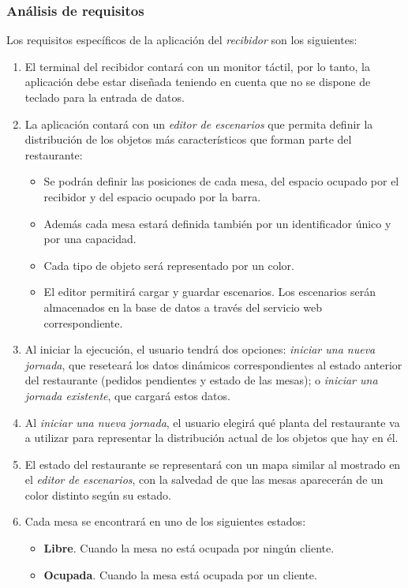 \subsubsection{Análisis de requisitos}
Los requisitos específicos de la aplicación del \emph{recibidor} son los
siguientes:
\begin{enumerate}
\item El terminal del recibidor contará con un monitor táctil,
por lo tanto, la aplicación debe estar diseñada teniendo en cuenta que no se
dispone de teclado para la entrada de datos.
\item La aplicación contará con un \emph{editor de escenarios} que permita
definir la distribución de los objetos más característicos que forman
parte del restaurante:
  \begin{itemize}
  \item Se podrán definir las posiciones de cada mesa, del espacio ocupado por
  el recibidor y del espacio ocupado por la barra.
  \item Además cada mesa estará definida también por un identificador único y
  por una capacidad.
  \item Cada tipo de objeto será representado por un color.
  \item El editor permitirá cargar y guardar escenarios. Los escenarios serán
  almacenados en la base de datos a través del servicio web correspondiente.
  \end{itemize}
\item Al iniciar la ejecución, el usuario tendrá dos opciones:
\emph{iniciar una nueva jornada}, que reseteará los datos dinámicos
correspondientes al estado anterior del restaurante (pedidos pendientes y
estado de las mesas); o \emph{iniciar una jornada existente}, que cargará
estos datos.
\item Al \emph{iniciar una nueva jornada}, el usuario elegirá qué planta del
restaurante va a utilizar para representar la distribución actual de los
objetos que hay en él.
\item El estado del restaurante se representará con un mapa similar al mostrado
en el \emph{editor de escenarios}, con la salvedad de que las mesas aparecerán
de un color distinto según su estado.
\item Cada mesa se encontrará en uno de los siguientes estados:
  \begin{itemize}
  \item \textbf{Libre}. Cuando la mesa no está ocupada por ningún cliente.
  \item \textbf{Ocupada}. Cuando la mesa está ocupada por un cliente.

\end{itemize}
\end{enumerate}
